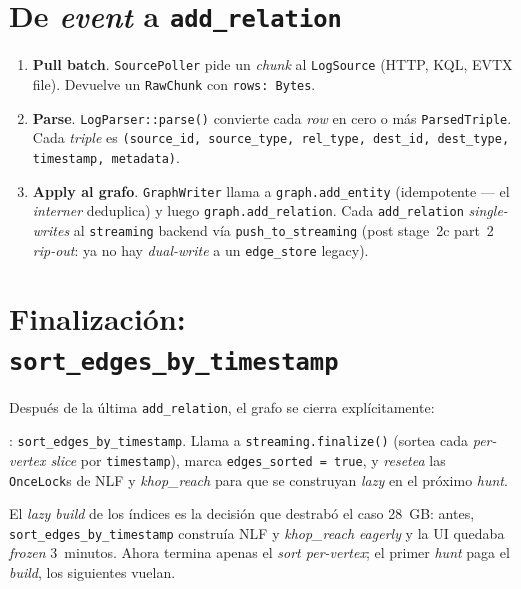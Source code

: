 \section{De \emph{event} a \texttt{add\_relation}}

\begin{enumerate}
    \item \textbf{Pull batch}. \texttt{SourcePoller} pide un \emph{chunk}
    al \texttt{LogSource} (HTTP, KQL, EVTX file). Devuelve un
    \texttt{RawChunk} con \texttt{rows: Bytes}.
    \item \textbf{Parse}. \texttt{LogParser::parse()} convierte cada
    \emph{row} en cero o más \texttt{ParsedTriple}. Cada \emph{triple}
    es \texttt{(source\_id, source\_type, rel\_type, dest\_id,
    dest\_type, timestamp, metadata)}.
    \item \textbf{Apply al grafo}. \texttt{GraphWriter} llama a
    \texttt{graph.add\_entity} (idempotente — el \emph{interner}
    deduplica) y luego \texttt{graph.add\_relation}. Cada
    \texttt{add\_relation} \emph{single-writes} al
    \texttt{streaming} backend vía \texttt{push\_to\_streaming}
    (post stage~2c part~2 \emph{rip-out}: ya no hay
    \emph{dual-write} a un \texttt{edge\_store} legacy).
\end{enumerate}

\section{Finalización: \texttt{sort\_edges\_by\_timestamp}}

Después de la última \texttt{add\_relation}, el grafo se cierra
explícitamente:

\begin{enelcodigo}
: \texttt{sort\_edges\_by\_timestamp}.
Llama a \texttt{streaming.finalize()} (sortea cada \emph{per-vertex
slice} por \texttt{timestamp}), marca \texttt{edges\_sorted = true}, y
\emph{resetea} las \texttt{OnceLock}s de NLF y \emph{khop\_reach} para
que se construyan \emph{lazy} en el próximo \emph{hunt}.
\end{enelcodigo}

\begin{intuicion}
El \emph{lazy build} de los índices es la decisión que destrabó
el caso 28~GB: antes, \texttt{sort\_edges\_by\_timestamp} construía
NLF y \emph{khop\_reach} \emph{eagerly} y la UI quedaba \emph{frozen}
3~minutos. Ahora termina apenas el \emph{sort per-vertex}; el primer
\emph{hunt} paga el \emph{build}, los siguientes vuelan.
\end{intuicion}

